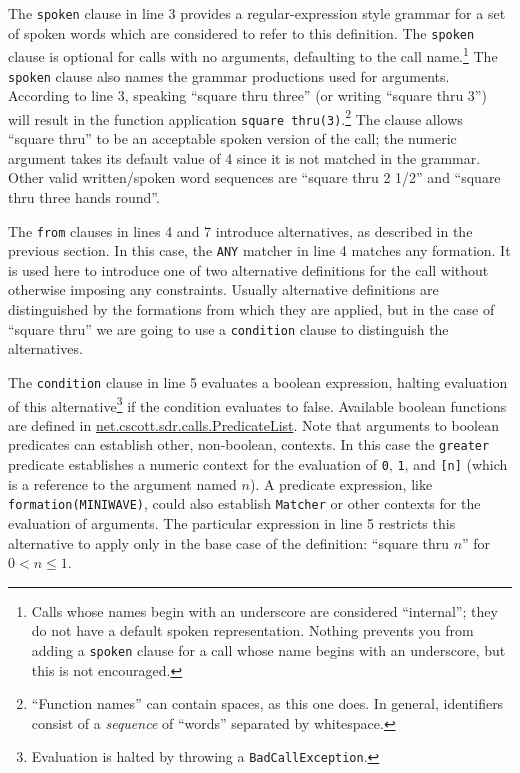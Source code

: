 \documentclass[12pt]{article}
\newcommand{\clause}[1]{\texttt{#1}}
\newcommand{\expr}[1]{\texttt{#1}}
\renewcommand{\call}[1]{\texttt{#1}} %
\newcommand{\package}[1]{\url{#1}}
\begin{document}
The \clause{spoken} clause in line 3 provides a regular-expression
style grammar for a set of spoken words which are considered to refer
to this definition.  The \clause{spoken} clause is optional for calls
with no arguments, defaulting to the call name.\footnote{Calls whose
  names begin with an underscore are considered ``internal''; they do
  not have a default spoken representation.  Nothing prevents you from
  adding a \clause{spoken} clause for a call whose name begins with an
  underscore, but this is not encouraged.}  The \clause{spoken} clause
also names the grammar productions used for arguments.  According to
line 3, speaking ``square thru three'' (or writing ``square thru 3'')
will result in the function application \expr{square
  thru(3)}.\footnote{``Function names'' can contain spaces, as this
  one does.  In general, identifiers consist of a \textit{sequence} of
  ``words'' separated by whitespace.}  The clause allows ``square
thru'' to be an acceptable spoken version of the call; the numeric
argument takes its default value of 4 since it is not matched in the
grammar.  Other valid written/spoken word sequences are ``square thru 2 1/2''
and ``square thru three hands round''.

The \clause{from} clauses in lines 4 and 7 introduce alternatives, as
described in the previous section.  In this case, the \texttt{ANY}
matcher in line 4 matches any formation.  It is used here to introduce
one of two alternative definitions for the call without otherwise
imposing any constraints.  Usually alternative definitions are
distinguished by the formations from which they are applied, but in
the case of ``square thru'' we are going to use a \clause{condition}
clause to distinguish the alternatives.

The \clause{condition} clause in line 5 evaluates a boolean
expression, halting evaluation of this alternative\footnote{Evaluation
  is halted by throwing a \texttt{BadCallException}.} if the condition
evaluates to false.  Available boolean functions are defined in
\package{net.cscott.sdr.calls.PredicateList}.  Note that arguments to
boolean predicates can establish other, non-boolean, contexts.  In
this case the \call{greater} predicate establishes a numeric context
for the evaluation of \expr{0}, \expr{1}, and \expr{[n]} (which
is a reference to the argument named $n$).  A predicate expression,
like \expr{formation(MINIWAVE)}, could also establish
\texttt{Matcher} or other contexts for the evaluation of arguments.
The particular expression in line 5 restricts this alternative to
apply only in the base case of the definition: ``square thru $n$'' for
$0 < n \leq 1$.
\end{document}
